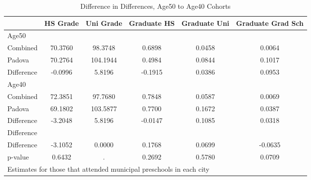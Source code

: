 \begin{table}[htbp]\centering
\caption{Difference in Differences, Age50 to Age40 Cohorts}
\begin{tabular}{l*{5}{c}}
\hline\hline
            &    HS Grade&   Uni Grade& Graduate HS&Graduate Uni&Graduate Grad Sch\\
\hline
Age50       &            &            &            &            &            \\
Combined    &     70.3760&     98.3748&      0.6898&      0.0458&      0.0064\\
Padova      &     70.2764&    104.1944&      0.4984&      0.0844&      0.1017\\
Difference  &     -0.0996&      5.8196&     -0.1915&      0.0386&      0.0953\\
\hline
Age40       &            &            &            &            &            \\
Combined    &     72.3851&     97.7680&      0.7848&      0.0587&      0.0069\\
Padova      &     69.1802&    103.5877&      0.7700&      0.1672&      0.0387\\
Difference  &     -3.2048&      5.8196&     -0.0147&      0.1085&      0.0318\\
\hline
Difference  &            &            &            &            &            \\
Difference  &     -3.1052&      0.0000&      0.1768&      0.0699&     -0.0635\\
p-value     &      0.6432&           .&      0.2692&      0.5780&      0.0709\\
\hline\hline
\multicolumn{6}{l}{\footnotesize Estimates for those that attended municipal preschools in each city}\\
\end{tabular}
\end{table}
